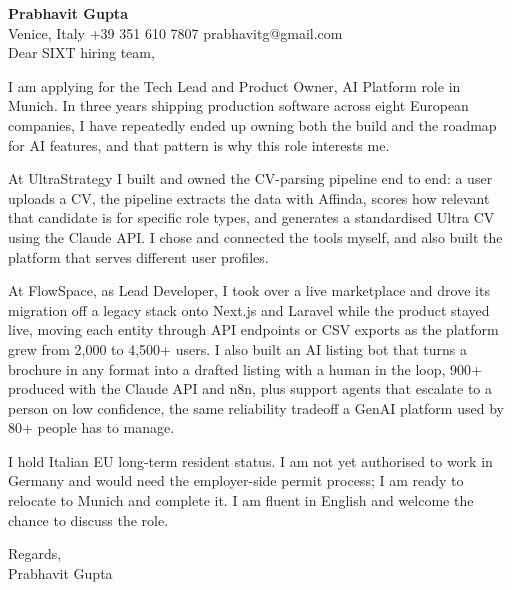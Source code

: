 \documentclass[a4paper,10.5pt]{article}
\begin{document}
\textbf{Prabhavit Gupta}\\
Venice, Italy \textbar{} +39 351 610 7807 \textbar{} prabhavitg@gmail.com\\[10pt]
Dear SIXT hiring team,

I am applying for the Tech Lead and Product Owner, AI Platform role in Munich. In three years shipping production software across eight European companies, I have repeatedly ended up owning both the build and the roadmap for AI features, and that pattern is why this role interests me.

At UltraStrategy I built and owned the CV-parsing pipeline end to end: a user uploads a CV, the pipeline extracts the data with Affinda, scores how relevant that candidate is for specific role types, and generates a standardised Ultra CV using the Claude API. I chose and connected the tools myself, and also built the platform that serves different user profiles.

At FlowSpace, as Lead Developer, I took over a live marketplace and drove its migration off a legacy stack onto Next.js and Laravel while the product stayed live, moving each entity through API endpoints or CSV exports as the platform grew from 2,000 to 4,500+ users. I also built an AI listing bot that turns a brochure in any format into a drafted listing with a human in the loop, 900+ produced with the Claude API and n8n, plus support agents that escalate to a person on low confidence, the same reliability tradeoff a GenAI platform used by 80+ people has to manage.

I hold Italian EU long-term resident status. I am not yet authorised to work in Germany and would need the employer-side permit process; I am ready to relocate to Munich and complete it. I am fluent in English and welcome the chance to discuss the role.

Regards,\\
Prabhavit Gupta
\end{document}
